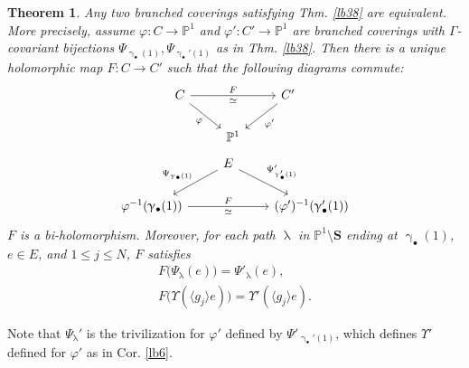\documentclass[11pt,b5paper,notitlepage]{article}
\theoremstyle{definition}
\theoremstyle{plain}
\newtheorem{thm}[df]{Theorem}
\newcommand{\bk}[1]{\langle {#1}\rangle}
\newcommand{\blt}{\bullet}
\newcommand{\Pbb}{\mathbb P}
\newcommand{\Sbf}{\mathbf{S}}
\numberwithin{equation}{subsection}
\begin{document}
\begin{thm}\label{lb29}
Any two branched coverings satisfying Thm. \ref{lb38} are equivalent. More precisely, assume $\varphi:C\rightarrow\Pbb^1$ and $\varphi':C'\rightarrow\Pbb^1$ are branched coverings with $\Gamma$-covariant bijections $\Psi_{\upgamma_\blt(1)},\Psi_{\upgamma_\blt'(1)}$ as in Thm. \ref{lb38}. Then there is a unique holomorphic map $F:C\rightarrow C'$ such that  the following diagrams commute:
\begin{equation}\label{eq6}
\begin{tikzcd}
C \arrow[rr, "F","\simeq"'] \arrow[dr, "\varphi"'] && C' \arrow[dl, "\varphi'"] \\
&  \Pbb^1
\end{tikzcd}	
\end{equation}
\begin{equation}\label{eq68}
\begin{tikzcd}
&E \arrow[dl, "\Psi_{\upgamma_\blt(1)}"'] \arrow[dr,  "{\Psi'_{\upgamma_\blt'(1)}}"]\\
\varphi^{-1}(\upgamma_\blt(1))\arrow[rr, "F", "\simeq"'] && (\varphi')^{-1}(\upgamma_\blt'(1))
\end{tikzcd}
\end{equation}
$F$ is a bi-holomorphism. Moreover, for each path $\uplambda$ in $\Pbb^1\setminus\Sbf$ ending at $\upgamma_\blt(1)$, $e\in E$, and $1\leq j\leq N$, $F$ satisfies 
\begin{gather*}
F\big(\Psi_\uplambda(e)\big)=\Psi'_\uplambda(e),\\
F\big(\Upsilon(\bk{g_j}e)\big)=\Upsilon'(\bk{g_j}e).
\end{gather*}
\end{thm}

Note that $\Psi_\uplambda'$ is the trivilization for $\varphi'$ defined by $\Psi'_{\upgamma_\blt'(1)}$, which defines $\Upsilon'$  defined for $\varphi'$ as in Cor. \ref{lb6}.
\end{document}
